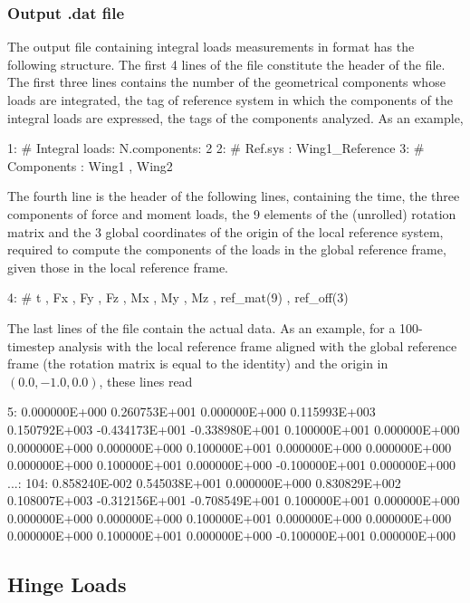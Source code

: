 \subsubsection{Output .dat file}
The output file containing integral loads measurements in  format has the following structure.
The first 4 lines of the file constitute the header of the file. The first three lines contains the number of the geometrical components  whose loads are integrated, the tag of reference system in which the components of the integral loads are expressed, the tags of the  components analyzed. As an example,
\begin{inputfile}
  1:  # Integral loads: N.components: 2
  2:  #                 Ref.sys     : Wing1_Reference
  3:  #                 Components  : Wing1 , Wing2
\end{inputfile}
The fourth line is the header of the following lines, containing the time, the three components of force and moment loads, the 9 elements of the (unrolled) rotation matrix and the 3 global coordinates of the origin of the local reference system, required to compute the components of the loads in the global reference frame, given those in the local reference frame.
\begin{inputfile}
  4:  #  t , Fx , Fy , Fz , Mx , My , Mz , ref_mat(9) , ref_off(3) 
\end{inputfile}
The last lines of the file contain the actual data. As an example, for a 100-timestep analysis with the local reference frame  aligned with the global reference frame (the rotation matrix is equal to the identity) and the origin in $(0.0,-1.0,0.0)$, these lines read
\begin{inputfile}
  5: 0.000000E+000  0.260753E+001  0.000000E+000  0.115993E+003
     0.150792E+003 -0.434173E+001 -0.338980E+001  0.100000E+001
     0.000000E+000  0.000000E+000  0.000000E+000  0.100000E+001
     0.000000E+000  0.000000E+000  0.000000E+000  0.100000E+001
     0.000000E+000 -0.100000E+001  0.000000E+000
...:
104: 0.858240E-002  0.545038E+001  0.000000E+000  0.830829E+002
     0.108007E+003 -0.312156E+001 -0.708549E+001  0.100000E+001
     0.000000E+000  0.000000E+000  0.000000E+000  0.100000E+001
     0.000000E+000  0.000000E+000  0.000000E+000  0.100000E+001
     0.000000E+000 -0.100000E+001  0.000000E+000
\end{inputfile}

\subsection{Hinge Loads}

